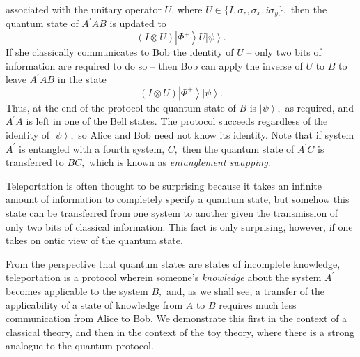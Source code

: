 \documentclass[pra,nofootinbib,showpacs,12pt]{revtex4}
\begin{document}
associated with the unitary operator $U$, where $U\in \{I,\sigma _{z},\sigma
_{x},i\sigma _{y}\},$ then the quantum state of $A^{\prime }AB$ is updated
to
\begin{equation}
(I\otimes U)\left| \Phi ^{+}\right\rangle U\left| \psi \right\rangle .
\end{equation}
If she classically communicates to Bob the identity of $U$ -- only two bits
of information are required to do so -- then Bob can apply the inverse of $U$
to $B$ to leave $A^{\prime }AB$ in the state
\begin{equation}
(I\otimes U)\left| \Phi ^{+}\right\rangle \left| \psi \right\rangle .
\end{equation}
Thus, at the end of the protocol the quantum state of $B$ is $\left| \psi
\right\rangle ,$ as required, and $A^{\prime }A$ is left in one of the Bell
states. The protocol succeeds regardless of the identity of $\left| \psi
\right\rangle ,$ so Alice and Bob need not know its identity. Note that if
system $A^{\prime }$ is entangled with a fourth system, $C,$ then the
quantum state of $A^{\prime }C$ is transferred to $BC,$ which is known as
\emph{entanglement swapping}.

Teleportation is often thought to be surprising because it takes an infinite
amount of information to completely specify a quantum state, but somehow
this state can be transferred from one system to another given the
transmission of only two bits of classical information. This fact is only
surprising, however, if one takes on ontic view of the quantum state. \strut
From the perspective that quantum states are states of incomplete knowledge,
teleportation is a protocol wherein someone's \emph{knowledge} about the
system $A^{\prime }$ becomes applicable to the system $B,$ and, as we shall
see, a transfer of the applicability of a state of knowledge from $A$ to $B$
requires much less communication from Alice to Bob. We demonstrate this
first in the context of a classical theory, and then in the context of the
toy theory, where there is a strong analogue to the quantum protocol.
\end{document}

